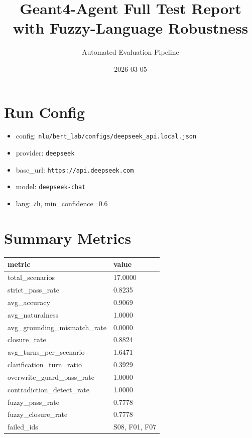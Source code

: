 \documentclass[11pt]{ctexart}
\title{Geant4-Agent Full Test Report with Fuzzy-Language Robustness}
\author{Automated Evaluation Pipeline}
\date{2026-03-05}
\begin{document}
\maketitle
\section{Run Config}
\begin{itemize}
\item config: \texttt{nlu/bert\_lab/configs/deepseek\_api.local.json}
\item provider: \texttt{deepseek}
\item base\_url: \texttt{https://api.deepseek.com}
\item model: \texttt{deepseek-chat}
\item lang: \texttt{zh}, min\_confidence=0.6
\end{itemize}
\section{Summary Metrics}
\begin{longtable}{ll}
\toprule
metric & value\\
\midrule
total\_scenarios & 17.0000 \\
strict\_pass\_rate & 0.8235 \\
avg\_accuracy & 0.9069 \\
avg\_naturalness & 1.0000 \\
avg\_grounding\_mismatch\_rate & 0.0000 \\
closure\_rate & 0.8824 \\
avg\_turns\_per\_scenario & 1.6471 \\
clarification\_turn\_ratio & 0.3929 \\
overwrite\_guard\_pass\_rate & 1.0000 \\
contradiction\_detect\_rate & 1.0000 \\
fuzzy\_pass\_rate & 0.7778 \\
fuzzy\_closure\_rate & 0.7778 \\
failed\_ids & S08, F01, F07 \\
\bottomrule
\end{longtable}
\end{document}
